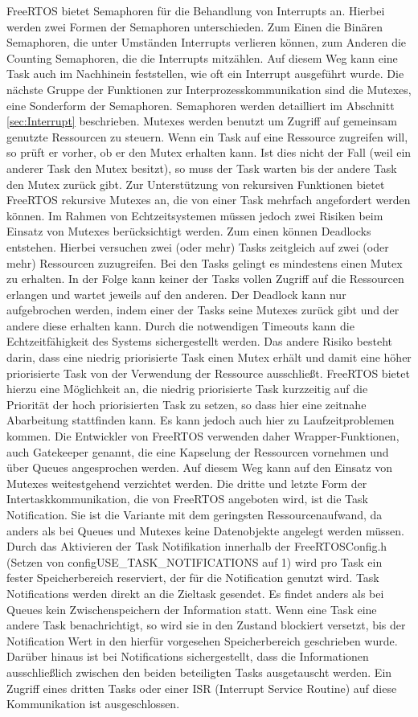 FreeRTOS bietet Semaphoren für die Behandlung von Interrupts an. Hierbei werden zwei Formen der Semaphoren unterschieden. Zum Einen die Binären Semaphoren, die unter Umständen Interrupts verlieren können, zum Anderen die Counting Semaphoren, die die Interrupts mitzählen. Auf diesem Weg kann eine Task auch im Nachhinein feststellen, wie oft ein Interrupt ausgeführt wurde.
Die nächste Gruppe der Funktionen zur Interprozesskommunikation sind die Mutexes, eine Sonderform der Semaphoren. Semaphoren werden detailliert im Abschnitt \ref{sec:Interrupt} beschrieben. Mutexes werden benutzt um Zugriff auf gemeinsam genutzte Ressourcen zu steuern. Wenn ein Task auf eine Ressource zugreifen will, so prüft er vorher, ob er den Mutex erhalten kann. Ist dies nicht der Fall (weil ein anderer Task den Mutex besitzt), so muss der Task warten bis der andere Task den Mutex zurück gibt. Zur Unterstützung von rekursiven Funktionen bietet FreeRTOS rekursive Mutexes an, die von einer Task mehrfach angefordert werden können. Im Rahmen von Echtzeitsystemen müssen jedoch zwei Risiken beim Einsatz von Mutexes berücksichtigt werden. Zum einen können Deadlocks entstehen. Hierbei versuchen zwei (oder mehr) Tasks zeitgleich auf zwei (oder mehr) Ressourcen zuzugreifen. Bei den Tasks gelingt es mindestens einen Mutex zu erhalten. In der Folge kann keiner der Tasks vollen Zugriff auf die Ressourcen erlangen und wartet jeweils auf den anderen. Der Deadlock kann nur aufgebrochen werden, indem einer der Tasks seine Mutexes zurück gibt und der andere diese erhalten kann. Durch die notwendigen Timeouts kann die Echt\-zeit\-fähig\-keit des Systems sichergestellt werden. Das andere Risiko besteht darin, dass eine niedrig priorisierte Task einen Mutex erhält und damit eine höher priorisierte Task von der Verwendung der Ressource ausschließt. FreeRTOS bietet hierzu eine Möglichkeit an, die niedrig priorisierte Task kurzzeitig auf die Priorität der hoch priorisierten Task zu setzen, so dass hier eine zeitnahe Abarbeitung stattfinden kann. Es kann jedoch auch hier zu Laufzeitproblemen kommen. Die Entwickler von FreeRTOS verwenden daher Wrapper-Funktionen, auch Gatekeeper genannt, die eine Kapselung der Ressourcen vornehmen und über Queues angesprochen werden. Auf diesem Weg kann auf den Einsatz von Mutexes weitestgehend verzichtet werden.
Die dritte und letzte Form der Intertaskkommunikation, die von FreeRTOS angeboten wird, ist die Task Notification. Sie ist die Variante mit dem geringsten Ressourcenaufwand, da anders als bei Queues und Mutexes keine Datenobjekte angelegt werden müssen. Durch das Aktivieren der Task Notifikation innerhalb der FreeRTOSConfig.h (Setzen von configUSE\_TASK\_NOTIFICATIONS auf 1) wird pro Task ein fester Speicherbereich reserviert, der für die Notification genutzt wird. Task Notifications werden direkt an die Zieltask gesendet. Es findet anders als bei Queues kein Zwischenspeichern der Information statt. Wenn eine Task eine andere Task benachrichtigt, so wird sie in den Zustand blockiert versetzt, bis der Notification Wert in den hierfür vorgesehen Speicherbereich geschrieben wurde. Darüber hinaus ist bei Notifications sichergestellt, dass die Informationen ausschließlich zwischen den beiden beteiligten Tasks ausgetauscht werden. Ein Zugriff eines dritten Tasks oder einer ISR (Interrupt Service Routine) auf diese Kommunikation ist ausgeschlossen.